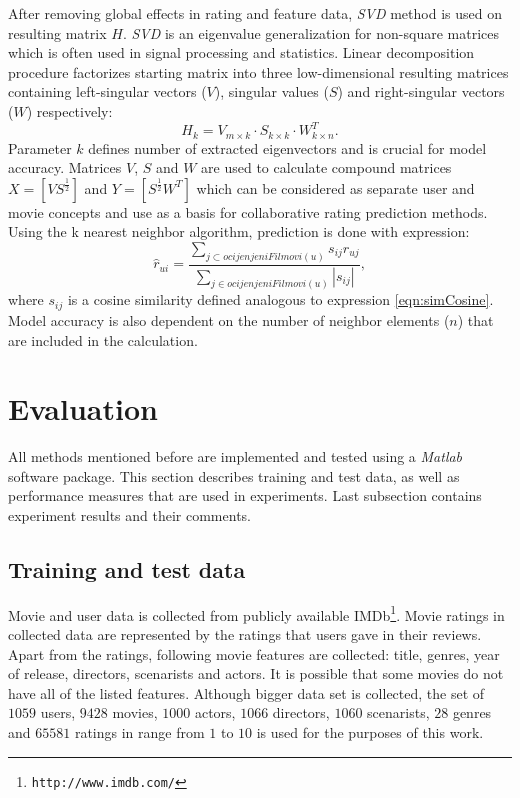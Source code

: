 \documentclass[conference,a4paper]{IEEEtran}
\begin{document}
After removing global effects in rating and feature data, \emph{SVD} method is
used on resulting matrix $H$. \emph{SVD} is an eigenvalue generalization for
non-square matrices which is often used in signal processing and statistics.
Linear decomposition procedure factorizes starting matrix into three
low-dimensional resulting matrices containing left-singular vectors ($V$),
singular values ($S$) and right-singular vectors ($W$) respectively:
\[
H_{k} = V_{m \times k} \cdot S_{k \times k} \cdot W^T_{k \times n}.
\]
Parameter $k$ defines number of extracted eigenvectors and is crucial for model
accuracy. Matrices $V$, $S$ and $W$ are used to calculate compound matrices $X
= [VS^{\frac{1}{2}}]$ and $Y = [S^{\frac{1}{2}}W^T]$ which can be considered as
separate user and movie concepts and use as a basis for collaborative rating
prediction methods. Using the k nearest neighbor algorithm, prediction is done
with expression:
\[
\hat{r}_{ui} = \frac{\sum\limits_{j \subset \mathit{ocijenjeniFilmovi}(u)}
s_{ij} r_{uj}}{\sum\limits_{j \in \mathit{ocijenjeniFilmovi}(u)}
|s_{ij}|},
\]
where $s_{ij}$ is a cosine similarity defined analogous to expression
\eqref{eqn:simCosine}. Model accuracy is also dependent on the number of
neighbor elements ($n$) that are included in the calculation.

\section{Evaluation}

All methods mentioned before are implemented and tested using a \emph{Matlab}
software package. This section describes training and test data, as well as
performance measures that are used in experiments. Last subsection contains
experiment results and their comments.

\subsection{Training and test data}

Movie and user data is collected from publicly available
IMDb\footnote{\texttt{http://www.imdb.com/}}. Movie ratings in collected data
are represented by the ratings that users gave in their reviews. Apart from the
ratings, following movie features are collected: title, genres, year of
release, directors, scenarists and actors. It is possible that some movies do
not have all of the listed features. Although bigger data set is collected, the
set of $1059$ users, $9428$ movies, $1000$ actors, $1066$ directors, $1060$
scenarists, $28$ genres and $65581$ ratings in range from $1$ to $10$ is used
for the purposes of this work.
\end{document}
